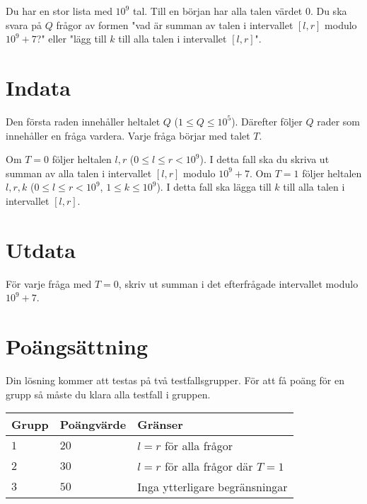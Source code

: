Du har en stor lista med $10^9$ tal. Till en början har alla talen värdet $0$. Du ska svara på $Q$ frågor av formen "vad är summan av talen i intervallet $[l,r]$ modulo $10^9+7$?" eller "lägg till $k$ till alla talen i intervallet $[l,r]$".

\section*{Indata}
Den första raden innehåller heltalet $Q$ ($1 \leq Q \leq 10^5$).
Därefter följer $Q$ rader som innehåller en fråga vardera. Varje fråga börjar med talet $T$.

Om $T=0$ följer heltalen $l,r$ ($0 \leq l \leq r < 10^9$). I detta fall ska du skriva ut summan av alla talen i intervallet $[l,r]$ modulo $10^9+7$.
Om $T=1$ följer heltalen $l,r,k$ ($0 \leq l \leq r < 10^9$, $1 \leq k \leq 10^9$). I detta fall ska lägga till $k$ till alla talen i intervallet $[l,r]$.

\section*{Utdata}
För varje fråga med $T=0$, skriv ut summan i det efterfrågade intervallet modulo $10^9+7$.

\section*{Poängsättning}
Din lösning kommer att testas på två testfallsgrupper.
\noindent
För att få poäng för en grupp så måste du klara alla testfall i gruppen.

\noindent
\begin{tabular}{| l | l | l |}
\hline
  Grupp & Poängvärde & Gränser \\ \hline
  $1$    & $20$       &  $l=r$ för alla frågor \\ \hline
  $2$    & $30$       &  $l=r$ för alla frågor där $T=1$ \\ \hline
  $3$    & $50$       &  Inga ytterligare begränsningar \\ \hline
\end{tabular}
